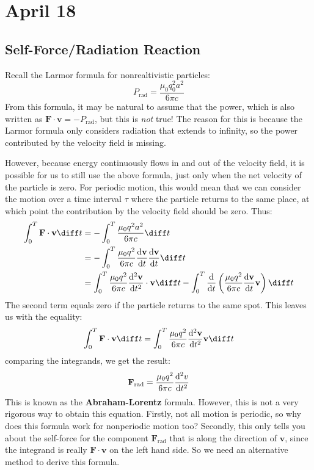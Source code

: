 \section{April 18}
\subsection{Self-Force/Radiation Reaction}
Recall the Larmor formula for nonrealtivistic particles:
\[
	P_\text{rad} = \frac{\mu_0 q_0^2 a^2}{6 \pi c}
\]
From this formula, it may be natural to assume that the power, which is also written as \( \mathbf{F} \cdot
\mathbf{v} = - P_\text{rad} \), but this is \textit{not} true! The reason for this is because the Larmor
formula only considers radiation that extends to infinity, so the power contributed by the velocity field is
missing. 

However, because energy continuously flows in and out of the velocity field, it is possible for us to still
use the above formula, just only when the net velocity of the particle is zero. For periodic motion, this
would mean that we can consider the motion over a time interval \( \tau \) where the particle returns to the
same place, at which point the contribution by the velocity field should be zero. Thus:
\begin{align*}
	\int_{0}^{T} \mathbf{F} \cdot \mathbf{v} \diff t &= - \int_{0}^{T} \frac{\mu_0 q^2 a^2}{6 \pi c} \diff
	t\\
	 &= - \int_{0}^{T} \frac{\mu_0 q^2}{6 \pi c}
	 \dv{\mathbf{v}}{t} \dv{\mathbf{v}}{t} \diff t \\ 
	 &= \int_{0}^{T} \frac{\mu_0 q^2}{6 \pi c} \dv[2]{\mathbf{v}}{t} \cdot \mathbf{v} \diff t - 
	 \int_{0}^{T} \dv{t} \left( \frac{\mu_0 q^2}{6 \pi c} \dv{\mathbf{v}}{t} \mathbf{v} \right) \diff t	
\end{align*}
The second term equals zero if the particle returns to the same spot. This leaves us with the equality:
\[
	\int_{0}^{T} \mathbf{F} \cdot \mathbf{v} \diff t = \int_{0}^{T} \frac{\mu_0 q^2}{6 \pi c}
	\dv[2]{\mathbf{v}}{t} \mathbf{v} \diff t
\]
comparing the integrands, we get the result:
\[
	\mathbf{F}_\text{rad} = \frac{\mu_0 q^2}{6 \pi c} \dv[2]{v}{t}
\]
This is known as the \textbf{Abraham-Lorentz} formula. However, this is not a very rigorous way to obtain this
equation. Firstly, not all motion is periodic, so why does this formula work for nonperiodic motion too?
Secondly, this only tells you about the self-force for the component \( \mathbf{F}_\text{rad} \) that is
along the direction of \( \mathbf{v} \), since the integrand is really \( \mathbf{F} \cdot \mathbf{v} \) on
the left hand side. So we need an alternative method to derive this formula.    

